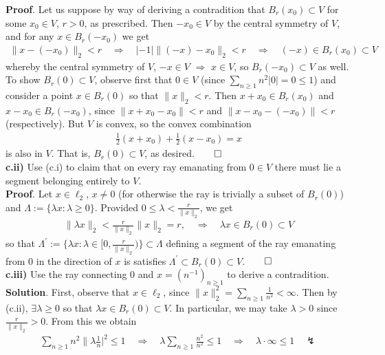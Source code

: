 \documentclass[10pt]{article}
\newcommand{\1}[1]{\mathbbm{1}_{#1}}
\begin{document}
    {\bf Proof}. Let us suppose by way of deriving a contradition that
    $B_r(x_0)\subset V$ for some $x_0\in V$, $r>0$, as prescribed. Then $-x_0\in
    V$ by the central symmetry of $V$, and for any $x\in B_r(-x_0)$ we get
    \begin{align*}
        \|x-(-x_0)\|_2<r\quad\Rightarrow\quad|-1|\|(-x)-x_0\|_2<r\quad\Rightarrow\quad (-x)\in B_r(x_0)\subset V
    \end{align*}
    whereby the central symmetry of $V$, $-x\in V$ $\Rightarrow$  $x\in V$, so
    $B_r(-x_0)\subset V$ as well. To show $B_r(0)\subset V$, observe first that
    $0\in V$ (since $\sum_{n\geq 1}n^2|0|=0\leq 1$) and consider a point $x\in
    B_r(0)$ so that $\|x\|_2<r$. Then $x+x_0\in B_r(x_0)$ and $x-x_0\in
    B_r(-x_0)$, since $\|x+x_0-x_0\|<r$ and $\|x-x_0-(-x_0)\|<r$ (respectively).
    But $V$ is convex, so the convex combination
    \begin{align*}
        \frac{1}{2}(x+x_0)+\frac{1}{2}(x-x_0)=x
    \end{align*}
    is also in $V$. That is, $B_r(0)\subset V$, as desired.\hfill{$\qed$}\\[5pt]
    {\bf c.ii)} Use (c.i) to claim that on every ray emanating from $0\in V$
    there must lie a segment belonging entirely to $V$.\\[5pt]
    {\bf Proof}. Let $x\in\ell_2$, $x\neq 0$ (for otherwise the ray is trivially
    a subset of $B_r(0)$) and $\Lambda:=\{\lambda x:\lambda\geq 0\}$. Provided
    $0\leq \lambda<\tfrac{r}{\|x\|_2}$, we get
    \begin{align*}
        \|\lambda x\|_2<\frac{r}{\|x\|_2}\|x\|_2=r,\quad\Rightarrow\quad \lambda x\in B_r(0)\subset V
    \end{align*}
    so that $\Lambda^\prime:=\{\lambda
    x:\lambda\in[0,\tfrac{r}{\|x\|_2})\}\subset\Lambda$ defining a segment of
    the ray emanating from $0$ in the direction of $x$ is satisfies
    $\Lambda^\prime\subset B_r(0)\subset V$.\hfill{$\qed$}\\[5pt]
    {\bf c.iii)} Use the ray connecting $0$ and $x=(n^{-1})_{n\geq 1}$ to derive
    a contradition.\\[5pt]
    {\bf Solution}. First, observe that $x\in\ell_2$, since
    $\|x\|_2^2=\sum_{n\geq 1}\tfrac{1}{n^2}<\infty$. Then by (c.ii), $\exists
    \lambda\geq 0$ so that $\lambda x\in B_r(0)\subset V$. In particular, we may
    take $\lambda>0$ since $\tfrac{r}{\|x\|_2}>0$. From this we obtain
    \begin{align*}
        \sum_{n\geq 1}n^2\|\lambda\frac{1}{n}|^2\leq 1\quad\Rightarrow\quad\lambda\sum_{n\geq 1}\frac{n^2}{n^2}\leq 1\quad\Rightarrow\quad\lambda\cdot\infty\leq 1\quad\lightning
    \end{align*}
\end{document}
